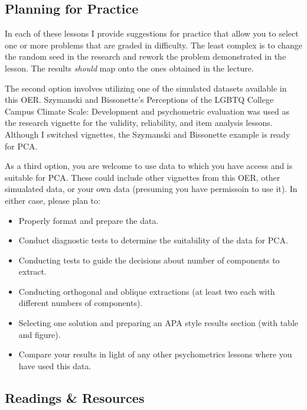 \documentclass[
  english,
]{book}
\providecommand{\tightlist}{%
  \setlength{\itemsep}{0pt}\setlength{\parskip}{0pt}}
\begin{document}
\hypertarget{planning-for-practice-6}{%
\subsection{Planning for Practice}\label{planning-for-practice-6}}

In each of these lessons I provide suggestions for practice that allow you to select one or more problems that are graded in difficulty. The least complex is to change the random seed in the research and rework the problem demonstrated in the lesson. The results \emph{should} map onto the ones obtained in the lecture.

The second option involves utilizing one of the simulated datasets available in this OER. Szymanski and Bissonette's \citeyearpar{szymanski_perceptions_2020}Perceptions of the LGBTQ College Campus Climate Scale: Development and psychometric evaluation was used as the research vignette for the validity, reliability, and item analysis lessons. Although I switched vignettes, the Szymanski and Bissonette example is ready for PCA.

As a third option, you are welcome to use data to which you have access and is suitable for PCA. These could include other vignettes from this OER, other simualated data, or your own data (presuming you have permissoin to use it). In either case, please plan to:

\begin{itemize}
\tightlist
\item
  Properly format and prepare the data.
\item
  Conduct diagnostic tests to determine the suitability of the data for PCA.
\item
  Conducting tests to guide the decisions about number of components to extract.
\item
  Conducting orthogonal and oblique extractions (at least two each with different numbers of components).
\item
  Selecting one solution and preparing an APA style results section (with table and figure).
\item
  Compare your results in light of any other psychometrics lessons where you have used this data.
\end{itemize}

\hypertarget{readings-resources-6}{%
\subsection{Readings \& Resources}\label{readings-resources-6}}
\end{document}
